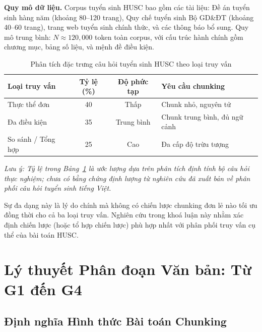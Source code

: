 \documentclass[12pt,a4paper]{report}
\theoremstyle{plain}
\theoremstyle{definition}
\begin{document}
	\textbf{Quy mô dữ liệu.} Corpus tuyển sinh HUSC bao gồm các tài liệu:
	Đề án tuyển sinh hàng năm (khoảng 80--120 trang), Quy chế tuyển sinh Bộ
	GD\&ĐT (khoảng 40--60 trang), trang web tuyển sinh chính thức, và các
	thông báo bổ sung. Quy mô trung bình: $N \approx 120{,}000$ token toàn
	corpus, với cấu trúc hành chính gồm chương mục, bảng số liệu, và mệnh đề
	điều kiện.
	
	\begin{table}[htbp]
		\centering
		\caption{Phân tích đặc trưng câu hỏi tuyển sinh HUSC theo loại truy vấn}
		\label{tab:husc_query_types}
		\begin{tabular}{lccl}
			\toprule
			\textbf{Loại truy vấn} & \textbf{Tỷ lệ (\%)} & \textbf{Độ phức tạp}
			& \textbf{Yêu cầu chunking} \\
			\midrule
			Thực thể đơn        & 40 & Thấp    & Chunk nhỏ, nguyên tử \\
			Đa điều kiện        & 35 & Trung bình & Chunk trung bình, đủ ngữ cảnh \\
			So sánh / Tổng hợp  & 25 & Cao     & Đa cấp độ trừu tượng \\
			\bottomrule
		\end{tabular}
	\end{table}
	
	\noindent\textit{Lưu ý: Tỷ lệ trong Bảng~\ref{tab:husc_query_types} là ước
		lượng dựa trên phân tích định tính bộ câu hỏi thực nghiệm; chưa có bằng
		chứng định lượng từ nghiên cứu đã xuất bản về phân phối câu hỏi tuyển sinh
		tiếng Việt.}
	
	Sự đa dạng này là lý do chính mà không có chiến lược chunking đơn lẻ nào
	tối ưu đồng thời cho cả ba loại truy vấn. Nghiên cứu trong khoá luận này
	nhằm xác định chiến lược (hoặc tổ hợp chiến lược) phù hợp nhất với phân
	phối truy vấn cụ thể của bài toán HUSC.
	
	
	\chapter{Lý thuyết Phân đoạn Văn bản: Từ G1 đến G4}
	\label{chap:chunking_theory}
	
	\section{Định nghĩa Hình thức Bài toán Chunking}
	\label{sec:chunking_formal}
	
\end{document}

